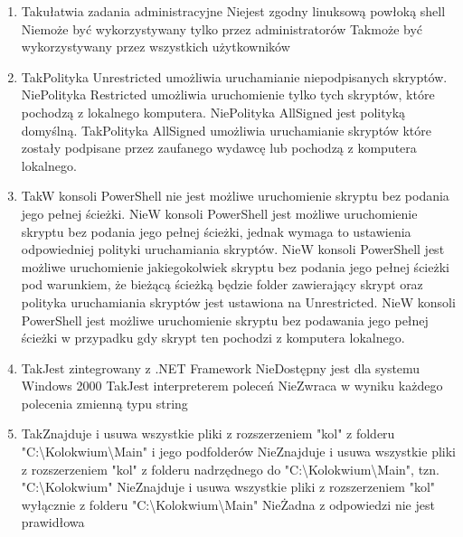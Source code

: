 \begin{enumerate}
		\newpage
		\item {}%
		{Tak}{ułatwia zadania administracyjne}%
		{Nie}{jest zgodny linuksową powłoką shell}%
		{Nie}{może być wykorzystywany tylko przez administratorów}%
		{Tak}{może być wykorzystywany przez wszystkich użytkowników}
		\item {}%
		{Tak}{Polityka Unrestricted umożliwia uruchamianie niepodpisanych skryptów.}%
		{Nie}{Polityka Restricted umożliwia uruchomienie tylko tych skryptów, które pochodzą z lokalnego komputera.}%
		{Nie}{Polityka AllSigned jest polityką domyślną.}%
		{Tak}{Polityka AllSigned umożliwia uruchamianie skryptów które zostały podpisane przez zaufanego wydawcę lub pochodzą z komputera lokalnego.}
		\item {}%
		{Tak}{W konsoli PowerShell nie jest możliwe uruchomienie skryptu bez podania jego pełnej ścieżki.}%
		{Nie}{W konsoli PowerShell jest możliwe uruchomienie skryptu bez podania jego pełnej ścieżki, jednak wymaga to ustawienia odpowiedniej polityki uruchamiania skryptów.}%
		{Nie}{W konsoli PowerShell jest możliwe uruchomienie jakiegokolwiek skryptu bez podania jego pełnej ścieżki pod warunkiem, że bieżącą ścieżką będzie folder zawierający skrypt oraz polityka uruchamiania skryptów jest ustawiona na Unrestricted.}%
		{Nie}{W konsoli PowerShell jest możliwe uruchomienie skryptu bez podawania jego pełnej ścieżki w przypadku gdy skrypt ten pochodzi z komputera lokalnego.}
		\item {}%
		{Tak}{Jest zintegrowany z .NET Framework}%
		{Nie}{Dostępny jest dla systemu Windows 2000}%
		{Tak}{Jest interpreterem poleceń}%
		{Nie}{Zwraca w wyniku każdego polecenia zmienną typu string}
		\item {}%
		{Tak}{Znajduje i usuwa wszystkie pliki z rozszerzeniem "kol" z folderu "C:\textbackslash Kolokwium\textbackslash Main" i jego podfolderów}%
		{Nie}{Znajduje i usuwa wszystkie pliki z rozszerzeniem "kol" z folderu nadrzędnego do "C:\textbackslash Kolokwium\textbackslash Main", tzn. "C:\textbackslash Kolokwium"}%
		{Nie}{Znajduje i usuwa wszystkie pliki z rozszerzeniem "kol" wyłącznie z folderu "C:\textbackslash Kolokwium\textbackslash Main"}%
		{Nie}{Żadna z odpowiedzi nie jest prawidłowa}
		

\end{enumerate}
